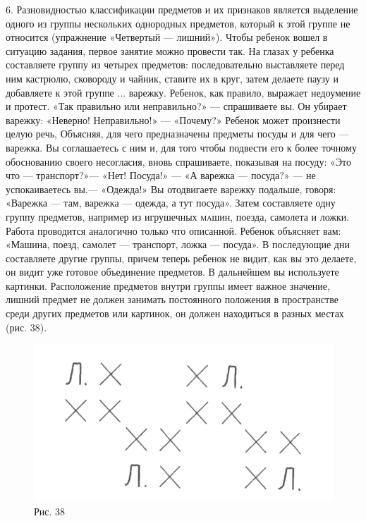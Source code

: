 \documentclass[a5paper]{book}
\begin{document}
6. Разновидностью классификации предметов и их признаков является
выделение одного из группы нескольких однородных предметов, который к
этой группе не относится (упражнение «Четвертый --- лишний»). Чтобы
ребенок вошел в ситуацию задания, первое занятие можно провести так. На
глазах у ребенка составляете группу из четырех предметов:
последовательно выставляете перед ним кастрюлю, сковороду и чайник,
ставите их в круг, затем делаете паузу и добавляете к этой группе ...
варежку. Ребенок, как правило, выражает недоумение и протест. «Так
правильно или неправильно?» --- спрашиваете вы. Он убирает варежку:
«Неверно! Неправильно!» --- «Почему?» Ребенок может произнести целую
речь, Объясняя, для чего предназначены предметы посуды и для чего ---
варежка. Вы соглашаетесь с ним и, для того чтобы подвести его к более
точному обоснованию своего несогласия, вновь спрашиваете, показывая на
посуду: «Это что --- транспорт?»--- «Нет! Посуда!» --- «А варежка ---
посуда?» --- не успокаиваетесь вы.--- «Одежда!» Вы отодвигаете варежку
подальше, говоря: «Варежка --- там, варежка --- одежда, а тут посуда».
Затем составляете одну группу предметов, например из игрушечных
\textsc{ма}шин, поезда, самолета и ложки. Работа проводится аналогично
только что описанной. Ребенок объясняет вам: «Машина, поезд, самолет ---
транспорт, ложка --- посуда». В последующие дни составляете другие
группы, причем теперь ребенок не видит, как вы это делаете, он видит уже
готовое объединение предметов. В дальнейшем вы используете картинки.
Расположение предметов внутри группы имеет важное значение, лишний
предмет не должен занимать постоянного положения в пространстве среди
других предметов или картинок, он должен находиться в разных местах
(рис. 38).

\begin{figure}
\centering
\includegraphics[width=\linewidth]{media/media/image35.png}
\caption*{Рис. 38}
\end{figure}
\end{document}
